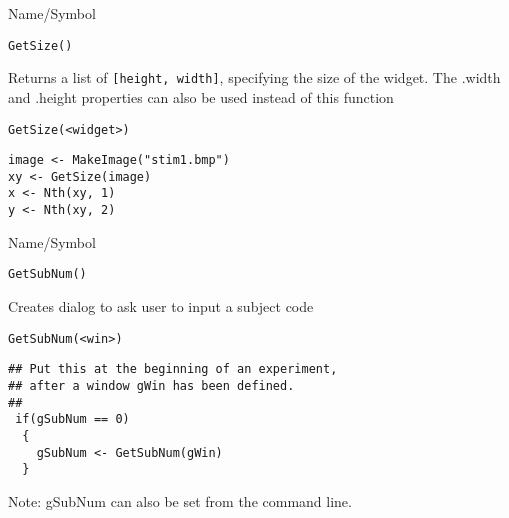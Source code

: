 \rl



\begin{desc}{Name/Symbol}
\item[Name/Symbol]	\verb+GetSize()+

\item[Description] Returns a list of \verb+[height, width]+,
  specifying the size of the widget.
  The .width and .height properties can also be used instead of this function

\item[Usage]
\begin{verbatim}
GetSize(<widget>)
\end{verbatim}

\item[Example]
\begin{verbatim}
image <- MakeImage("stim1.bmp")
xy <- GetSize(image)
x <- Nth(xy, 1)
y <- Nth(xy, 2)
\end{verbatim}

\item[See Also]	
\end{desc}

\rl


\begin{desc}{Name/Symbol}
\item[Name/Symbol]	\verb+GetSubNum()+

\item[Description]	Creates dialog to ask user to input a subject code

\item[Usage]
\begin{verbatim}
GetSubNum(<win>)
\end{verbatim}

\item[Example]

\begin{verbatim}
## Put this at the beginning of an experiment, 
## after a window gWin has been defined.
##
 if(gSubNum == 0)
  {
    gSubNum <- GetSubNum(gWin)
  }
\end{verbatim}
Note: gSubNum can also be set from the command line.
\item[See Also]
\end{desc}

\rl



